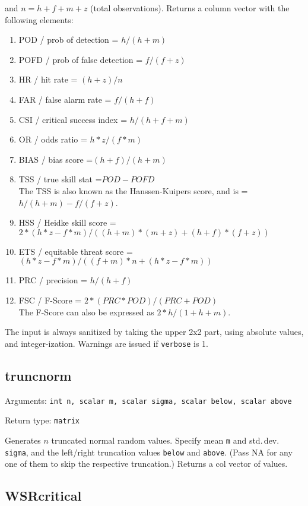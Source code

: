 \documentclass[11pt,english]{article}
\begin{document}
and $n=h+f+m+z$ (total observations). Returns a column vector with
the following elements:
\begin{enumerate}
\item POD / prob of detection = $h/(h+m)$
\item POFD / prob of false detection = $f/(f+z)$ 
\item HR / hit rate = $(h+z)/n$ 
\item FAR / false alarm rate = $f/(h+f)$ 
\item CSI / critical success index = $h/(h+f+m)$
\item OR / odds ratio = $h*z/(f*m)$
\item BIAS / bias score =$(h+f)/(h+m)$
\item TSS / true skill stat =$POD-POFD$\\
The TSS is also known as the Hanssen-Kuipers score, and is = $h/(h+m)-f/(f+z)$.
\item HSS / Heidke skill score = $2*(h*z-f*m)/((h+m)*(m+z)+(h+f)*(f+z))$
\item ETS / equitable threat score = $(h*z-f*m)/((f+m)*n+(h*z-f*m))$
\item PRC / precision = $h/(h+f)$
\item FSC / F-Score = $2*(PRC*POD)/(PRC+POD)$\\
The F-Score can also be expressed as $2*h/(1+h+m)$.
\end{enumerate}
The input is always sanitized by taking the upper 2x2 part, using
absolute values, and integer-ization. Warnings are issued if \texttt{verbose}
is 1. 

\subsection{truncnorm}

Arguments: \texttt{int n, scalar m, scalar sigma, scalar below, scalar
above}

\noindent Return type: \texttt{matrix}

Generates $n$ truncated normal random values. Specify mean \texttt{m}
and std.\,dev. \texttt{sigma}, and the left/right truncation values
\texttt{below} and \texttt{above}. (Pass NA for any one of them to
skip the respective truncation.) Returns a col vector of values.

\subsection{WSRcritical}
\end{document}
